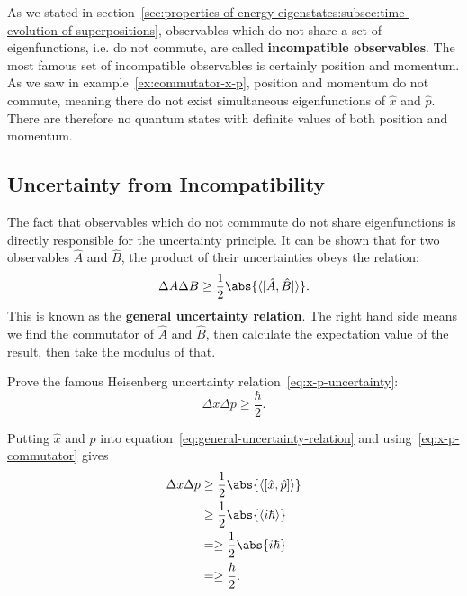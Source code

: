 \documentclass[../quantum_mechanics.tex]{subfiles}
\begin{document}
        As we stated in section~\ref{sec:properties-of-energy-eigenstates:subsec:time-evolution-of-superpositions}, observables which do not share a set of eigenfunctions, i.e. do not commute, are called \textbf{incompatible observables}. 
        The most famous set of incompatible observables is certainly position and momentum.
        As we saw in example~\ref{ex:commutator-x-p}, position and momentum do not commute, meaning there do not exist simultaneous eigenfunctions of $\hat{x}$ and $\hat{p}$.
        There are therefore no quantum states with definite values of both position and momentum.
        
        \subsection{Uncertainty from Incompatibility}\label{subsec:uncertainty-from-incompatibility}
            The fact that observables which do not commmute do not share eigenfunctions is directly responsible for the uncertainty principle.
            It can be shown that for two observables $\hat{A}$ and $\hat{B}$, the product of their uncertainties obeys the relation:
            \begin{equation}\label{eq:general-uncertainty-relation}
                \Delta A\Delta B\geq\frac{1}{2}\abs{\langle[\hat{A},\hat{B}]\rangle}.
            \end{equation}
            This is known as the \textbf{general uncertainty relation}.
            The right hand side means we find the commutator of $\hat{A}$ and $\hat{B}$, then calculate the expectation value of the result, then take the modulus of that.
            \begin{example}
                Prove the famous Heisenberg uncertainty relation~\ref{eq:x-p-uncertainty}:
                \begin{equation}
                    \Delta x\Delta p\geq\frac{\hbar}{2}.
                \end{equation}

                Putting $\hat{x}$ and $\hat{p}$ into equation~\ref{eq:general-uncertainty-relation} and using~\ref{eq:x-p-commutator} gives
                \begin{align}
                    \Delta x\Delta p&\geq\frac{1}{2}\abs{\langle[\hat{x},\hat{p}]\rangle}\\
                    &\geq\frac{1}{2}\abs{\langle i\hbar\rangle}\\
                    &=\geq\frac{1}{2}\abs{i\hbar}\\
                    &=\geq\frac{\hbar}{2}.
                \end{align}
            \end{example}
\end{document}
